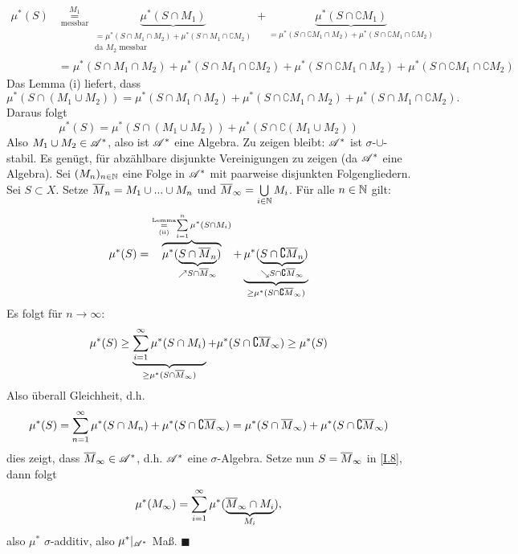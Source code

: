 \begin{equation*}
	\begin{split}
	\mu^*(S) & \underset{\text{messbar}}{\overset{M_1}=} 
	\underbrace{\mu^*(S \cap M_1)}_{ \substack{=
	\mu^*(S\cap M_1 \cap M_2) + \mu^* (S \cap M_1 \cap \complement M_2)\\\text{da } M_2 \text{ messbar}} 		} 
	+ \underbrace{\mu^* (S \cap \complement M_1)}_{=\mu^*(S\cap\complement M_1 \cap M_2) +\mu^*(S\cap \complement M_1 \cap \complement M_2)} \\
	& =\mu^*(S\cap M_1 \cap M_2) + \mu^* (S \cap M_1 \cap \complement M_2)+\mu^*(S\cap\complement M_1 \cap M_2) +\mu^*(S\cap \complement M_1 \cap \complement M_2)
	\end{split}
\end{equation*}
Das Lemma (i) liefert, dass \Bild
$$
\mu^*(S\cap (M_1 \cup M_2)) = \mu^*(S\cap M_1 \cap M_2) + \mu^* (S \cap \complement M_1 \cap M_2) + \mu^*(S\cap M_1 \cap \complement M_2).
$$
Daraus folgt
$$
\mu^*(S)= \mu^*(S\cap(M_1\cup M_2))+\mu^*(S\cap \complement (M_1 \cup M_2))
$$
Also $M_1 \cup M_2 \in \AA^*$, also ist $\AA^*$ eine Algebra. Zu zeigen bleibt: $\AA^*$ ist $\sigma$-$\cup$-stabil. Es genügt, für abzählbare disjunkte Vereinigungen zu zeigen (da $\AA^*$ eine Algebra). Sei $(M_n)_{n \in \N}$ eine Folge in $\AA^*$ mit paarweise disjunkten Folgengliedern. Sei $S \subset X$. Setze $\ol{M}_{n}=M_1 \cup ... \cup M_n$ und $\ol{M}_{\infty} = \bigcup\limits_{i\in\N}M_i$. Für alle $n \in \N$ gilt:
\begin{equation*}
\mu^*(S)=\overbrace{\mu^*(\underbrace{S\cap \ol{M}_n}_{\nearrow S \cap \ol{M}_\infty})}^{ \underset{(\text{ii})}{\overset{\text{\tiny Lemma}} {=}}\sum\limits_{i=1}^n\mu^*(S\cap M_i)} + \underbrace{\mu^*(\underbrace{S\cap \complement \ol{M}_n}_{\searrow S \cap \complement \ol{M}_\infty})}_{\geq \mu^*(S\cap \complement \ol{M}_\infty)}
\end{equation*}
Es folgt für $n\longrightarrow \infty$:
\begin{equation*}
	\mu^*(S) \geq \underbrace{\sum_{i=1}^\infty \mu^*(S \cap M_i)}_{\geq \mu^*(S\cap \ol{M}_\infty)} + \mu^*(S\cap \complement \ol{M}_\infty) \geq \mu^*(S)
\end{equation*}
Also überall Gleichheit, d.h.
\begin{equation} \label{I.8}
\mu^*(S) = \sum_{n=1}^\infty \mu^*(S\cap M_n) + \mu^*(S\cap \complement \ol{M}_\infty) =\mu^*(S\cap \ol{M}_\infty) + \mu^* (S \cap \complement \ol{M}_\infty)
\end{equation}
dies zeigt, dass $\ol{M}_\infty \in \AA^*$, d.h. $\AA^*$ eine $\sigma$-Algebra. Setze nun $S= \ol{M}_\infty$ in \eqref{I.8}, dann folgt
\begin{equation*}
\mu^*(M_\infty)=\sum_{i=1}^\infty \mu^*(\underbrace{\ol{M}_\infty \cap M_i}_{M_i}),
\end{equation*}
also $\mu^*$ $\sigma$-additiv, also $\mu^*|_{\AA^*}$ Maß. $\blacksquare$

